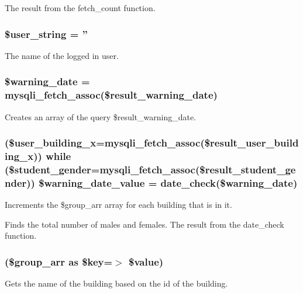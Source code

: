 \-The result from the fetch\-\_\-count function. \hypertarget{admin__view_2index_8php_af990a6460b9371f7ac0a860c265c47d9}{
\subsubsection[{\$user\-\_\-string}]{\setlength{\rightskip}{0pt plus 5cm}\$user\-\_\-string = ''}}\label{admin__view_2index_8php_af990a6460b9371f7ac0a860c265c47d9}
\-The name of the logged in user. \hypertarget{admin__view_2index_8php_a6e9f4ec234df3b3983352f341b57f8ba}{
\subsubsection[{\$warning\-\_\-date}]{\setlength{\rightskip}{0pt plus 5cm}\$warning\-\_\-date = mysqli\-\_\-fetch\-\_\-assoc(\$result\-\_\-warning\-\_\-date)}}\label{admin__view_2index_8php_a6e9f4ec234df3b3983352f341b57f8ba}
\-Creates an array of the query \$result\-\_\-warning\-\_\-date. \hypertarget{admin__view_2index_8php_a3d1961773bdbdee0e00ae0f8ff9d3aa5}{
\subsubsection[{\$warning\-\_\-date\-\_\-value}]{ (\$user\-\_\-building\-\_\-x=mysqli\-\_\-fetch\-\_\-assoc(\$result\-\_\-user\-\_\-building\-\_\-x)) {\bf while} (\$student\-\_\-gender=mysqli\-\_\-fetch\-\_\-assoc(\$result\-\_\-student\-\_\-gender)) \$warning\-\_\-date\-\_\-value = {\bf date\-\_\-check}(\$warning\-\_\-date)}}\label{admin__view_2index_8php_a3d1961773bdbdee0e00ae0f8ff9d3aa5}
\-Increments the \$group\-\_\-arr array for each building that is in it.

\-Finds the total number of males and females. \-The result from the date\-\_\-check function. \hypertarget{admin__view_2index_8php_ae8a8513d0c829bc40172efcee07e4b8f}{
\subsubsection[{foreach}]{(\$group\-\_\-arr as \$key=$>$ \$value)}}\label{admin__view_2index_8php_ae8a8513d0c829bc40172efcee07e4b8f}
\-Gets the name of the building based on the id of the building. 